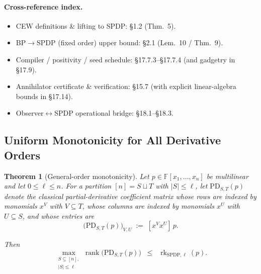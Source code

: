 \documentclass[12pt]{article}
\newtheorem{theorem}{Theorem}
\theoremstyle{definition}
\theoremstyle{definition}
\theoremstyle{remark}
\theoremstyle{remark}
\begin{document}
\paragraph{Cross-reference index.}
\begin{itemize}
\item CEW definitions \& lifting to SPDP: \S1.2 (Thm.~5).
\item BP$\to$SPDP (fixed order) upper bound: \S2.1 (Lem.~10 / Thm.~9).
\item Compiler / positivity / seed schedule: \S17.7.3--\S17.7.4 (and gadgetry in \S17.9).
\item Annihilator certificate \& verification: \S15.7 (with explicit linear-algebra bounds in \S17.14).
\item Observer$\leftrightarrow$SPDP operational bridge: \S18.1--\S18.3.
\end{itemize}

\subsection{Uniform Monotonicity for All Derivative Orders}
\label{subsec:monotonicity}

\begin{theorem}[General-order monotonicity]\label{thm:general-order-monotonicity}
Let $p \in \mathbb{F}[x_1, \ldots, x_n]$ be multilinear and let $0 \leq \ell \leq n$. For a partition $[n] = S \sqcup T$ with $|S| \leq \ell$, let $\mathrm{PD}_{S,T}(p)$ denote the classical partial-derivative coefficient matrix whose rows are indexed by monomials $x^V$ with $V \subseteq T$, whose columns are indexed by monomials $x^U$ with $U \subseteq S$, and whose entries are
\[
\bigl(\mathrm{PD}_{S,T}(p)\bigr)_{V,U} \;:=\; [x^V x^U]\, p.
\]

Then
\[
\max_{\substack{S \subseteq [n],\\ |S| \leq \ell}} \operatorname{rank}\!\bigl(\mathrm{PD}_{S,T}(p)\bigr) \;\;\le\;\; \operatorname{rk}_{\mathrm{SPDP},\ell}(p).
\]
\end{theorem}
\end{document}
